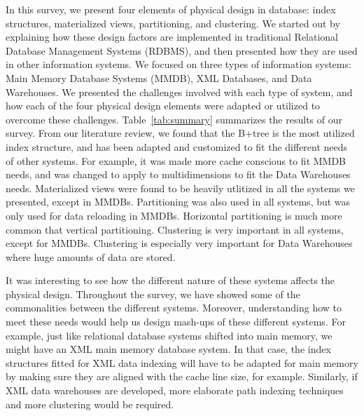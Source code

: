 \documentclass[12pt,a4paper]{article}
\begin{document}
In this survey, we present four elements of physical design in database: index structures, materialized views, partitioning, and clustering. We started out
by explaining how these design factors are implemented in traditional Relational Database Management Systems (RDBMS), and then presented how they are used in
other information systems. We focused on three types of information systems: Main Memory Database Systems (MMDB), XML Databases, and Data Warehouses. We
presented the challenges involved with each type of system, and how each of the four physical design elements were adapted or utilized to overcome these
challenges. Table~\ref{tab:summary} summarizes the results of our survey. From our literature review, we found that the B+tree is the most utilized index
structure, and has been adapted and customized to fit the different needs of other systems. For example, it was made more cache conscious to fit MMDB needs,
and was changed to apply to multidimensions to fit the Data Warehouses needs. Materialized views were found to be heavily utlitized in all the systems we
presented, except in MMDBs. Partitioning was also used in all systems, but was only used for data reloading in MMDBs. Horizontal partitioning is much more
common that vertical partitioning. Clustering is very important in all systems, except for MMDBs. Clustering is especially very important for Data Warehouses
where huge amounts of data are stored.

It was interesting to see how the different nature of these systems affects the physical design. Throughout the survey, we have showed some of the
commonalities between the different systems. Moreover, understanding how to meet these needs would help us design mash-ups of these different systems. For
example, just like relational database systems shifted into main memory, we might have an XML main memory database system. In that case, the index structures
fitted for XML data indexing will have to be adapted for main memory by making sure they are aligned with the cache line size, for example. Similarly, if XML
data warehouses are developed, more elaborate path indexing techniques and more clustering would be required. 







\end{document}
